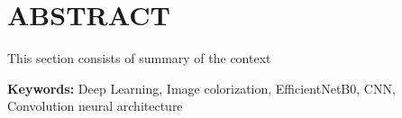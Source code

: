 
\chapter*{ABSTRACT}


This section consists of summary of the context

\par
\textbf{Keywords:} Deep Learning, Image colorization, EfficientNetB0, CNN, Convolution neural architecture

